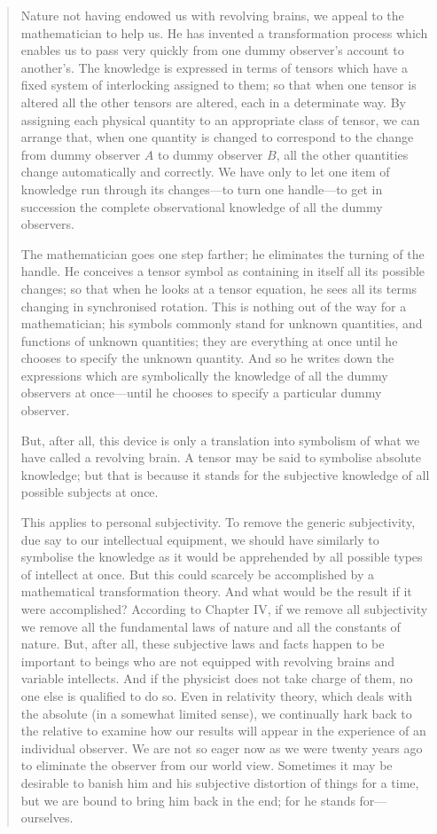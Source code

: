 \documentclass{article}
\begin{document}
\begin{quote}
    Nature not having endowed us with revolving brains, we appeal to the mathematician to help us.  He has invented a transformation process which enables us to pass very quickly from one dummy observer's account to another's.  The knowledge is expressed in terms of tensors which have a fixed system of interlocking assigned to them; so that when one tensor is altered all the other tensors are altered, each in a determinate way.  By assigning each physical quantity to an appropriate class of tensor, we can arrange that, when one quantity is changed to correspond to the change from dummy observer $A$ to dummy observer $B$, all the other quantities change automatically and correctly.  We have only to let one item of knowledge run through its changes---to turn one handle---to get in succession the complete observational knowledge of all the dummy observers.

    The mathematician goes one step farther; he eliminates the turning of the handle.  He conceives a tensor symbol as containing in itself all its possible changes; so that when he looks at a tensor equation, he sees all its terms changing in synchronised rotation.  This is nothing out of the way for a mathematician; his symbols commonly stand for unknown quantities, and functions of unknown quantities; they are everything at once until he chooses to specify the unknown quantity.  And so he writes down the expressions which are symbolically the knowledge of all the dummy observers at once---until he chooses to specify a particular dummy observer.

    But, after all, this device is only a translation into symbolism of what we have called a revolving brain.  A tensor may be said to symbolise absolute knowledge; but that is because it stands for the subjective knowledge of all possible subjects at once.  

    This applies to personal subjectivity.  To remove the generic subjectivity, due say to our intellectual equipment, we should have similarly to symbolise the knowledge as it would be apprehended by all possible types of intellect at once.  But this could scarcely be accomplished by a mathematical transformation theory.  And what would be the result if it were accomplished?  According to Chapter IV, if we remove all subjectivity we remove all the fundamental laws of nature and all the constants of nature.  But, after all, these subjective laws and facts happen to be important to beings who are not equipped with revolving brains and variable intellects.  And if the physicist does not take charge of them, no one else is qualified to do so.  Even in relativity theory, which deals with the absolute (in a somewhat limited sense), we continually hark back to the relative to examine how our results will appear in the experience of an individual observer.  We are not so eager now as we were twenty years ago to eliminate the observer from our world view.  Sometimes it may be desirable to banish him and his subjective distortion of things for a time, but we are bound to bring him back in the end; for he stands for---ourselves. \citep[p. 85-88]{Eddington1939}
\end{quote}
\end{document}
